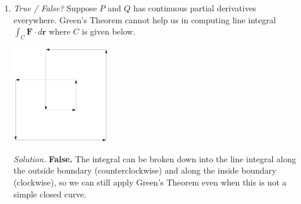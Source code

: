 \documentclass{article}
\newcommand{\rr}{\mathbf{r}}
\begin{document}
\begin{enumerate}
\item {\em True / False?} Suppose $P$ and $Q$ has continuous partial derivatives everywhere. Green's Theorem cannot help us in computing line integral $\int_C \mathbf{F} \cdot d\rr$ where $C$ is given below.
\begin{center}
\includegraphics[width=0.33\textwidth]{quiz12dis114pic}
\end{center}

{\em Solution.} {\bf False.} The integral can be broken down into the line integral along the outside boundary (counterclockwise) and along the inside boundary (clockwise), so we can still apply Green's Theorem even when this is not a simple closed curve.
\end{enumerate}
\end{document}
